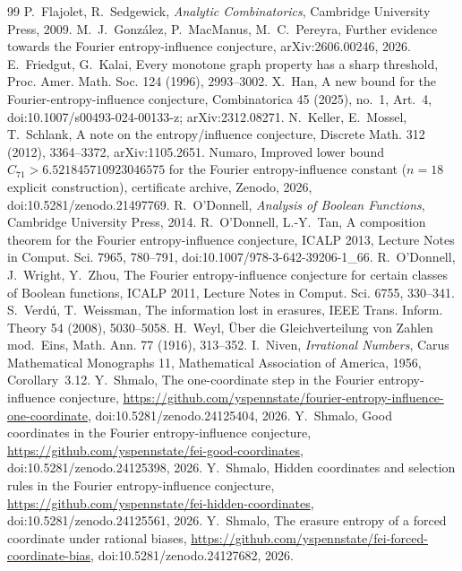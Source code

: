 \documentclass[11pt]{amsart}
\theoremstyle{remark}
\begin{document}
\begin{thebibliography}{99}
 P.~Flajolet, R.~Sedgewick, \emph{Analytic Combinatorics}, Cambridge University Press, 2009.
 M.~J.~Gonz\'alez, P.~MacManus, M.~C.~Pereyra, Further evidence towards the Fourier entropy-influence
conjecture, arXiv:2606.00246, 2026.
 E.~Friedgut, G.~Kalai, Every monotone graph property has a sharp threshold, Proc. Amer. Math. Soc.
124 (1996), 2993--3002.
 X.~Han, A new bound for the Fourier-entropy-influence conjecture, Combinatorica 45 (2025), no.~1,
Art.~4, doi:10.1007/s00493-024-00133-z; arXiv:2312.08271.
 N.~Keller, E.~Mossel, T.~Schlank, A note on the entropy/influence conjecture, Discrete Math. 312
(2012), 3364--3372, arXiv:1105.2651.
 Numaro, Improved lower bound $C_{71}>6.521845710923046575$ for the Fourier entropy-influence constant ($n=18$ explicit construction), certificate archive, Zenodo, 2026, doi:10.5281/zenodo.21497769.
 R.~O'Donnell, \emph{Analysis of Boolean Functions}, Cambridge University Press, 2014.
 R.~O'Donnell, L.-Y.~Tan, A composition theorem for the Fourier entropy-influence conjecture, ICALP 2013,
Lecture Notes in Comput. Sci. 7965, 780--791, doi:10.1007/978-3-642-39206-1\_66.
 R.~O'Donnell, J.~Wright, Y.~Zhou, The Fourier entropy-influence conjecture for certain classes of
Boolean functions, ICALP 2011, Lecture Notes in Comput. Sci. 6755, 330--341.
 S.~Verd\'u, T.~Weissman, The information lost in erasures, IEEE Trans. Inform. Theory 54 (2008),
5030--5058.
 H.~Weyl, \"Uber die Gleichverteilung von Zahlen mod.~Eins, Math. Ann. 77 (1916), 313--352.
 I.~Niven, \emph{Irrational Numbers}, Carus Mathematical Monographs 11, Mathematical Association of
America, 1956, Corollary~3.12.
 Y.~Shmalo, The one-coordinate step in the Fourier entropy-influence conjecture,
\url{https://github.com/yspennstate/fourier-entropy-influence-one-coordinate}, doi:10.5281/zenodo.24125404, 2026.
 Y.~Shmalo, Good coordinates in the Fourier entropy-influence conjecture,
\url{https://github.com/yspennstate/fei-good-coordinates}, doi:10.5281/zenodo.24125398, 2026.
 Y.~Shmalo, Hidden coordinates and selection rules in the Fourier entropy-influence conjecture,
\url{https://github.com/yspennstate/fei-hidden-coordinates}, doi:10.5281/zenodo.24125561, 2026.
 Y.~Shmalo, The erasure entropy of a forced coordinate under rational biases,
\url{https://github.com/yspennstate/fei-forced-coordinate-bias}, doi:10.5281/zenodo.24127682, 2026.

\end{thebibliography}
\end{document}
